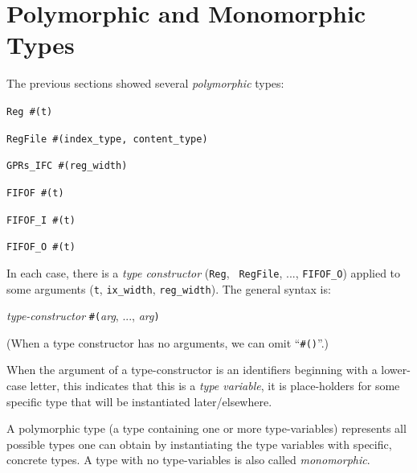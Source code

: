
\section{Polymorphic and Monomorphic Types}

\label{Sec_Polymorphic_Types}



The previous sections showed several \emph{polymorphic} types:

{\footnotesize
\begin{tightlist}
 \item \verb|Reg #(t)|
 \item \verb|RegFile #(index_type, content_type)|
 \item \verb|GPRs_IFC #(reg_width)|
 \item \verb|FIFOF #(t)|
 \item \verb|FIFOF_I #(t)|
 \item \verb|FIFOF_O #(t)|
\end{tightlist}
}

In each case, there is a \emph{type constructor} ({\tt Reg}, {\tt
RegFile}, ..., {\tt FIFOF\_O}) applied to some arguments ({\tt t},
{\tt ix\_width}, {\tt reg\_width}).  The general syntax is:

\begin{tabbing}
\hmm \emph{type-constructor} {\tt \#(}\emph{arg}, ..., \emph{arg}{\tt )}
\end{tabbing}

(When a type constructor has no arguments, we can omit ``{\tt \#()}''.)

When the argument of a type-constructor is an identifiers beginning
with a lower-case letter, this indicates that this is a \emph{type
variable}, {\ie} it is place-holders for some specific type that will
be instantiated later/elsewhere.

A polymorphic type (a type containing one or more type-variables)
represents all possible types one can obtain by instantiating the type
variables with specific, concrete types.  A type with no
type-variables is also called \emph{monomorphic}.

